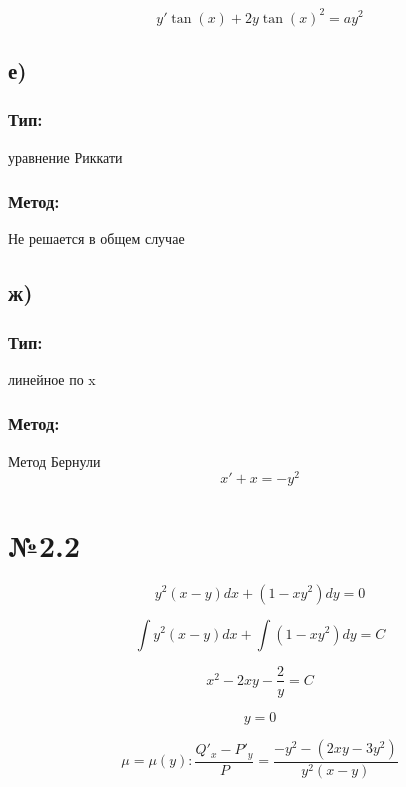 \documentclass{article}
\begin{document}
\begin{equation*}
y'\tan(x) + 2y\tan(x)^2 = ay^2
\end{equation*}

\subsection*{е)}
\subsubsection*{Тип:} 
уравнение Риккати

\subsubsection*{Метод:}
Не решается в общем случае

\subsection*{ж)}
\subsubsection*{Тип:} 
линейное по x

\subsubsection*{Метод:}
Метод Бернули
\begin{equation*}
x' + x = -y^2
\end{equation*}

\section*{№2.2}

\begin{equation*}
y^2(x - y)dx + (1 - xy^2)dy = 0
\end{equation*}

\begin{equation*}
    \int{y^2(x - y)dx} + \int{(1 - xy^2)dy} = C
\end{equation*}

\begin{equation*}
    x^2 - 2xy - \frac{2}{y} = C
\end{equation*}

\begin{equation*}
    y = 0
\end{equation*}

\begin{equation*}
\mu = \mu(y): \frac{Q'_x - P'_y}{P} = \frac{-y^2 - (2xy - 3y^2)}{y^2(x - y)}
\end{equation*}
\end{document}
